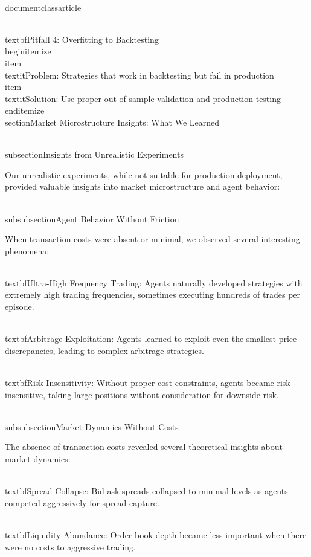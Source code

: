 \\documentclass{article}
\begin{document}
\\textbf{Pitfall 4: Overfitting to Backtesting}
\\begin{itemize}
\\item \\textit{Problem}: Strategies that work in backtesting but fail in production
\\item \\textit{Solution}: Use proper out-of-sample validation and production testing
\\end{itemize}
\n\n
\\section{Market Microstructure Insights: What We Learned}

\\subsection{Insights from Unrealistic Experiments}

Our unrealistic experiments, while not suitable for production deployment, provided valuable insights into market microstructure and agent behavior:

\\subsubsection{Agent Behavior Without Friction}

When transaction costs were absent or minimal, we observed several interesting phenomena:

\\textbf{Ultra-High Frequency Trading}: Agents naturally developed strategies with extremely high trading frequencies, sometimes executing hundreds of trades per episode.

\\textbf{Arbitrage Exploitation}: Agents learned to exploit even the smallest price discrepancies, leading to complex arbitrage strategies.

\\textbf{Risk Insensitivity}: Without proper cost constraints, agents became risk-insensitive, taking large positions without consideration for downside risk.

\\subsubsection{Market Dynamics Without Costs}

The absence of transaction costs revealed several theoretical insights about market dynamics:

\\textbf{Spread Collapse}: Bid-ask spreads collapsed to minimal levels as agents competed aggressively for spread capture.

\\textbf{Liquidity Abundance}: Order book depth became less important when there were no costs to aggressive trading.
\end{document}
